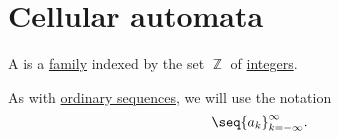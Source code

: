 \section{Cellular automata}\label{sec:cellular_automata}

\begin{definition}\label{def:doubly_infinite_sequence}
  A  is a \hyperref[def:indexed_family]{family} indexed by the set \( \BbbZ \) of \hyperref[def:integers]{integers}.

  As with \hyperref[def:sequence]{ordinary sequences}, we will use the notation
  \begin{equation*}
    \seq{ a_k }_{k=-\infty}^\infty.
  \end{equation*}
\end{definition}
